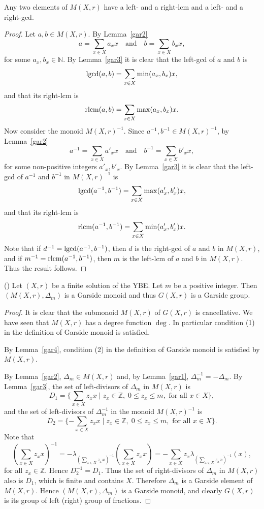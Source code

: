 \begin{lemma}\label{gar4} Any two elements of $M(X,r)$ have a left- and a
right-lcm and a left- and a right-gcd.
\end{lemma}

\begin{proof} Let $a,b\in M(X,r)$. By Lemma~\ref{gar2}
$$a=\sum_{x\in X}a_xx\quad\mbox{and}\quad b=\sum_{x\in X}b_xx,$$
for some $a_x,b_x\in \mathbb{N}$. By Lemma~\ref{gar3} it is clear
that the left-gcd of $a$ and $b$ is
$$\operatorname{lgcd}(a,b)=\sum_{x\in X}\min(a_x,b_x)x,$$
and that its right-lcm is
$$\operatorname{rlcm}(a,b)=\sum_{x\in X}\max(a_x,b_x)x.$$
Now consider the monoid $M(X,r)^{-1}$. Since $a^{-1},b^{-1}\in
M(X,r)^{-1}$, by Lem\-ma~\ref{gar2}
$$a^{-1}=\sum_{x\in X}a'_xx\quad\mbox{and}\quad b^{-1}=\sum_{x\in X}b'_xx,$$
for some non-positive integers $a'_x,b'_x$. By Lemma~\ref{gar3} it
is clear that the left-gcd of $a^{-1}$ and $b^{-1}$ in $M(X,r)^{-1}$
is
$$\operatorname{lgcd}(a^{-1},b^{-1})=\sum_{x\in X}\max(a'_x,b'_x)x,$$
and that its right-lcm is
$$\operatorname{rlcm}(a^{-1},b^{-1})=\sum_{x\in X}\min(a'_x,b'_x)x.$$
Note that if $d^{-1}=\operatorname{lgcd}(a^{-1},b^{-1})$, then $d$ is the
right-gcd of $a$ and $b$ in $M(X,r)$, and if
$m^{-1}=\operatorname{rlcm}(a^{-1},b^{-1})$, then $m$ is the left-lcm of $a$ and
$b$ in $M(X,r)$. Thus the result follows.
\end{proof}

\begin{theorem}\label{chouraqui} (\cite[Theorem~3.3]{MR2764830}) Let $(X,r)$ be a
finite solution of the YBE. Let $m$ be a positive integer. Then
$(M(X,r),\Delta_m)$ is a Garside monoid and thus $G(X,r)$ is a
Garside group.
\end{theorem}

\begin{proof} It is clear that the submonoid $M(X,r)$ of $G(X,r)$
is cancellative. We have seen that $M(X,r)$ has a degree function
$\deg$. In particular condition (1) in the definition of Garside
monoid is satisfied.

By Lemma~\ref{gar4}, condition (2) in the definition of Garside
monoid is satisfied by $M(X,r)$.

By Lemma~\ref{gar2}, $\Delta_m\in M(X,r)$ and, by Lemma~\ref{gar1},
$\Delta_m^{-1}=-\Delta_m$. By Lemma~\ref{gar3}, the set of
left-divisors of $\Delta_m$ in $M(X,r)$ is
$$D_1=\{\sum_{x\in X}z_xx\mid z_x\in \mathbb{Z},\; 0\leq z_x\leq m, \mbox{ for all }x\in X\},$$
and the set of left-divisors of $\Delta_m^{-1}$ in the monoid
$M(X,r)^{-1}$ is
$$D_2=\{-\sum_{x\in X}z_xx\mid z_x\in \mathbb{Z},\; 0\leq z_x\leq m, \mbox{ for all }x\in X\}.$$
Note that $$(\sum_{x\in X}z_xx)^{-1}=-\lambda_{(\sum_{x\in
X}z_xx)^{-1}}(\sum_{x\in X}z_xx)=-\sum_{x\in
X}z_x\lambda_{(\sum_{x\in X}z_xx)^{-1}}(x),$$ for all
$z_x\in\mathbb{Z}$. Hence $D_2^{-1}=D_1$. Thus the set of
right-divisors of $\Delta_m$ in $M(X,r)$ also is $D_1$, which is
finite and contains $X$. Therefore $\Delta_m$ is a Garside element
of $M(X,r)$. Hence $(M(X,r),\Delta_m)$ is a Garside monoid, and
clearly $G(X,r)$ is its group of left (right) group of fractions.
\end{proof}

